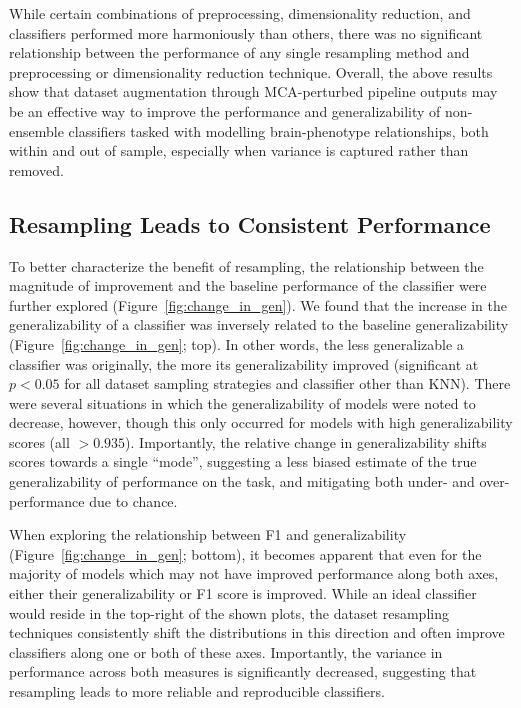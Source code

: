 \documentclass[10pt]{SelfArx} %
\begin{document}
While certain combinations of preprocessing, dimensionality reduction, and classifiers performed more harmoniously than
others, there was no significant relationship between the performance of any single resampling method and preprocessing
or dimensionality reduction technique. Overall, the above results show that dataset augmentation through MCA-perturbed
pipeline outputs may be an effective way to improve the performance and generalizability of non-ensemble classifiers
tasked with modelling brain-phenotype relationships, both within and out of sample, especially when variance is captured
rather than removed.

\subsection*{Resampling Leads to Consistent Performance}

To better characterize the benefit of resampling, the relationship between the magnitude of improvement and the
baseline performance of the classifier were further explored (Figure~\ref{fig:change_in_gen}). We found that the
increase in the generalizability of a classifier was inversely related to the baseline generalizability
(Figure~\ref{fig:change_in_gen}; top). In other words, the less generalizable a classifier was originally, the more its
generalizability improved (significant at $p < 0.05$ for all dataset sampling strategies and classifier other than
KNN). There were several situations in which the generalizability of models were noted to decrease, however, though
this only occurred for models with high generalizability scores (all $>0.935$). Importantly, the relative change in
generalizability shifts scores towards a single ``mode'', suggesting a less biased estimate of the true
generalizability of performance on the task, and mitigating both under- and over-performance due to chance.

When exploring the relationship between F1 and generalizability (Figure~\ref{fig:change_in_gen}; bottom), it becomes
apparent that even for the majority of models which may not have improved performance along both axes, either their
generalizability or F1 score is improved. While an ideal classifier would reside in the top-right of the shown plots,
the dataset resampling techniques consistently shift the distributions in this direction and often improve classifiers
along one or both of these axes. Importantly, the variance in performance across both measures is significantly
decreased, suggesting that resampling leads to more reliable and reproducible classifiers.
\end{document}
